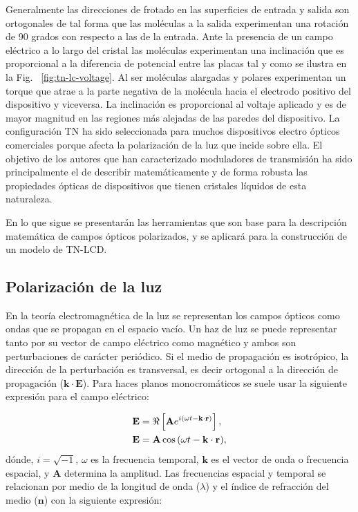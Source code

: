 Generalmente las direcciones de frotado en las superficies de entrada
y salida son ortogonales de tal forma que las moléculas a la salida experimentan
una rotación de 90 grados con respecto a las de la entrada. Ante la
presencia de un campo eléctrico a lo largo del cristal las moléculas
experimentan una inclinación que es proporcional a la diferencia de
potencial entre las placas tal y como se ilustra en la Fig.~
\ref{fig:tn-lc-voltage}. Al ser moléculas alargadas y polares
experimentan un torque que atrae a la parte negativa de la molécula
hacia el electrodo positivo del  dispositivo y viceversa. La
inclinación es proporcional al voltaje aplicado y es de mayor magnitud
en las regiones más alejadas de las paredes del dispositivo. La
configuración TN ha sido seleccionada para muchos
dispositivos electro ópticos comerciales porque afecta 
la polarización de la luz que incide sobre ella. El objetivo de los
autores que han caracterizado moduladores de transmisión ha sido
principalmente el de describir matemáticamente y de forma robusta las
propiedades ópticas de dispositivos que tienen cristales líquidos de
esta naturaleza.  

En lo que sigue se presentarán las herramientas que son
base para la descripción matemática de campos ópticos polarizados, y
se aplicará para la construcción de un modelo de TN-LCD.

\subsection{Polarización de la luz}

En la teoría electromagnética de la luz se representan los campos
ópticos como ondas que se propagan en el espacio vacío. Un haz de luz
se puede representar tanto por su vector de campo eléctrico como
magnético y ambos son perturbaciones de carácter periódico. Si el
medio de propagación es isotrópico, la dirección de la perturbación 
es transversal, es decir ortogonal a la dirección de propagación
($\mathbf{k}\cdot\mathbf{E}$). Para haces planos monocromáticos se
suele usar la siguiente expresión para el campo eléctrico:  

\begin{align}
\mathbf{E} &=\Re\left[\mathbf{A}e^{i\left( \omega t -\mathbf{k}\cdot \mathbf{r}\right)}\right]\label{eq:complex_field},\\
\mathbf{E} &=\mathbf{A}\cos{ \left(\omega t -\mathbf{k}\cdot
    \mathbf{r}\right)},\notag
\end{align}
dónde, $i = \sqrt{-1}$, $\omega$ es la frecuencia temporal, $\mathbf{k}$ es el vector de
onda o frecuencia espacial, y $\mathbf{A}$ determina la amplitud.
Las frecuencias espacial y temporal se relacionan por medio de la
longitud de onda  ($\lambda$) y el índice de refracción del medio ($\mathbf{n}$) con la
siguiente expresión:

